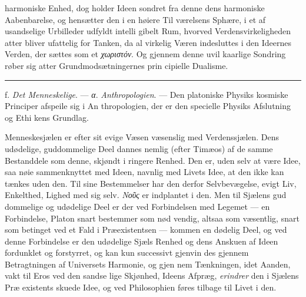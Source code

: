 \documentclass[12pt,a4paper]{book}
\newcommand{\divrule}{\begin{center}\rule{2cm}{0.4pt}\end{center}}
\newcommand{\gk}[1]{\textit{#1}}
\begin{document}
harmoniske Enhed, dog holder Ideen sondret fra denne dens
harmoniske Aabenbarelse, og hensætter den i en høiere Til\-%
værelsens Sphære, i et af usandselige Urbilleder udfyldt intelli\-%
gibelt Rum, hvorved Verdensvirkeligheden atter bliver ufattelig
for Tanken, da al virkelig Væren indesluttes i den Ideernes
Verden, der sættes som et \gk{χωριστόν}. Og gjennem denne uvil\-%
kaarlige Sondring røber sig atter Grundmodsætningernes prin\-%
cipielle Dualisme.

\divrule

f. \emph{Det Menneskelige}. --- \gk{α}. \emph{Anthropologien}. ---
Den platoniske Physiks kosmiske Principer afspeile sig i An\-%
thropologien, der er den specielle Physiks Afslutning og Ethi\-%
kens Grundlag.

Menneskesjælen er efter sit evige Væsen væsenslig med
Verdenssjælen. Dens udødelige, guddommelige Deel dannes
nemlig (efter Timæos) af de samme Bestanddele som denne,
skjøndt i ringere Renhed. Den er, uden selv at være Idee,
saa nøie sammenknyttet med Ideen, navnlig med Livets Idee,
at den ikke kan tænkes uden den. Til sine Bestemmelser har
den derfor Selvbevægelse, evigt Liv, Enkelthed, Lighed med
sig selv. \gk{Νοῦς} er indplantet i den. Men til Sjælens gud\-%
dommelige og udødelige Deel er der ved Forbindelsen med
Legemet --- en Forbindelse, Platon snart bestemmer som nød\-%
vendig, altsaa som væsentlig, snart som betinget ved et Fald
i Præexistentsen --- kommen en dødelig Deel, og ved denne
Forbindelse er den udødelige Sjæls Renhed og dens Anskuen af
Ideen fordunklet og forstyrret, og kan kun successivt gjenvin\-%
des gjennem Betragtningen af Universets Harmonie, og gjen\-%
nem Tænkningen, idet Aanden, vakt til Eros ved den sandse\-%
lige Skjønhed, Ideens Afpræg, \emph{erindrer} den i Sjælens Præ\-%
existents skuede Idee, og ved Philosophien føres tilbage til
Livet i den.
\end{document}
